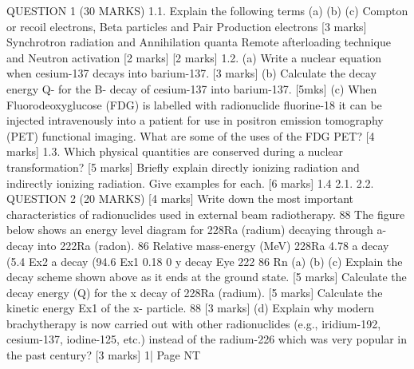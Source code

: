 \documentclass[addpoints]{exam}
\begin{document}
\begin{questions}
\begin{parts}
QUESTION 1 (30 MARKS)
1.1.
Explain the following terms
(a)
(b)
(c)
Compton or recoil electrons, Beta particles and Pair Production electrons [3 marks] Synchrotron radiation and Annihilation quanta
Remote afterloading technique and Neutron activation
[2 marks]
[2 marks]
1.2. (a) Write a nuclear equation when cesium-137 decays into barium-137. [3 marks] (b) Calculate the decay energy Q- for the B- decay of cesium-137 into barium-137. [5mks] (c) When Fluorodeoxyglucose (FDG) is labelled with radionuclide fluorine-18 it can be injected intravenously into a patient for use in positron emission tomography (PET) functional imaging. What are some of the uses of the FDG PET? [4 marks]
1.3. Which physical quantities are conserved during a nuclear transformation? [5 marks] Briefly explain directly ionizing radiation and indirectly ionizing radiation. Give examples for each. [6 marks]
1.4
2.1.
2.2.
QUESTION 2 (20 MARKS)
[4 marks]
Write down the most important characteristics of radionuclides used in external beam radiotherapy.
88
The figure below shows an energy level diagram for 228Ra (radium) decaying through a-decay into 222Ra (radon).
86
Relative mass-energy (MeV)
228Ra
4.78
a decay (5.4%
Ex2
a decay (94.6%
Ex1
0.18
0
y decay Eye
222 86
Rn
(a)
(b)
(c)
Explain the decay scheme shown above as it ends at the ground state. [5 marks] Calculate the decay energy (Q) for the x decay of 228Ra (radium). [5 marks] Calculate the kinetic energy Ex1 of the x- particle.
88
[3 marks]
(d)
Explain why modern brachytherapy is now carried out with other radionuclides (e.g., iridium-192, cesium-137, iodine-125, etc.) instead of the radium-226 which was very popular in the past century?
[3 marks]
1| Page
NT
﻿


\end{parts}
\end{questions}
\end{document}
